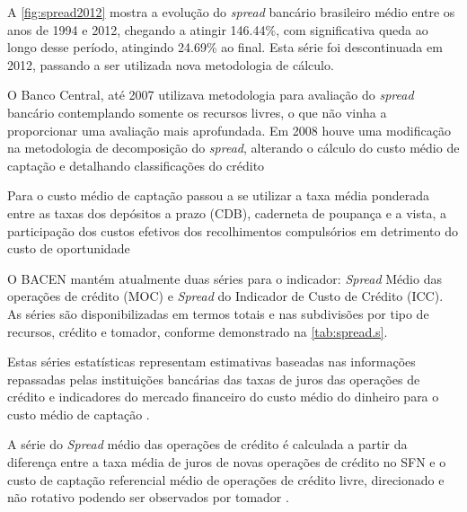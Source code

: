 \documentclass[12pt,12pt,openright,oneside,a4paper,chapter=TITLE,section=TITLE,subsection=TITLE,subsubsection=TITLE,english,french,spanish,portugues,sumario=tradicional]{abntex2}
\begin{document}
A \autoref{fig:spread2012} mostra a evolução do \emph{spread} bancário brasileiro
médio entre os anos de 1994 e 2012, chegando a atingir 146.44\%, com
significativa queda ao longo desse período, atingindo 24.69\% ao final. Esta série foi descontinuada em 2012, passando a ser utilizada nova
metodologia de cálculo.

O Banco Central, até 2007 utilizava metodologia para avaliação do \emph{spread}
bancário contemplando somente os recursos livres, o que não vinha a
proporcionar uma avaliação mais aprofundada. Em 2008 houve uma modificação na
metodologia de decomposição do \emph{spread}, alterando o cálculo do custo médio de
captação e detalhando classificações do crédito \cite{dantas:2012}

Para o custo médio de captação passou a se utilizar a taxa média ponderada
entre as taxas dos depósitos a prazo (CDB), caderneta de poupança e a vista,
a participação dos custos efetivos dos recolhimentos compulsórios em detrimento
do custo de oportunidade \cite{dantas:2012}

O BACEN mantém atualmente duas séries para o indicador: \emph{Spread} Médio das operações de crédito (MOC) e \emph{Spread} do Indicador de Custo de Crédito (ICC). As séries são disponibilizadas em termos totais e nas subdivisões por tipo de
recursos, crédito e tomador, conforme demonstrado na \autoref{tab:spread.s}.

\begin{table}

\label{tab:spread.s}
\end{table}

Estas séries estatísticas representam estimativas baseadas nas informações
repassadas pelas instituições bancárias das taxas de juros das operações de
crédito e indicadores do mercado financeiro do custo médio do dinheiro para o
custo médio de captação \cite{BCB:2016}.

A série do \emph{Spread} médio das operações de crédito é calculada a partir da
diferença entre a taxa média de juros de novas operações de crédito no SFN e o
custo de captação referencial médio de operações de crédito livre, direcionado
e não rotativo podendo ser observados por tomador \cite{BCB:2016}.
\end{document}
